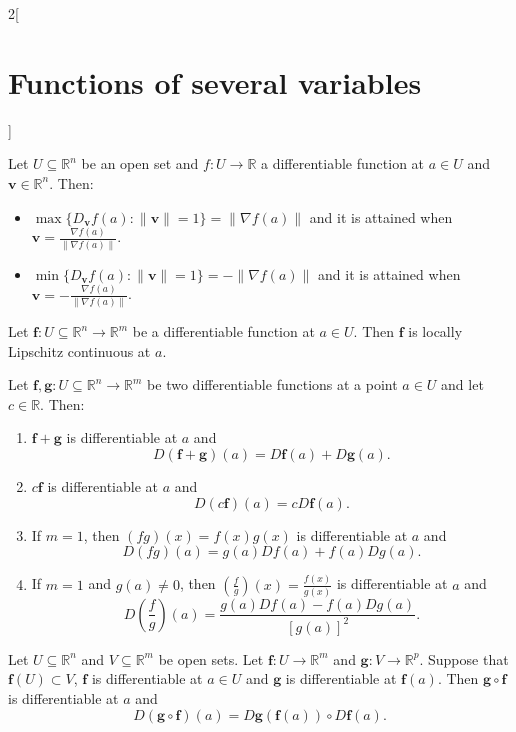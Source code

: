 \documentclass[../../../main.tex]{subfiles}
\begin{document}
\begin{multicols}{2}[\section{Functions of several variables}]
\begin{prop}
\end{prop}
\begin{prop}
Let $U\subseteq\mathbb{R}^n$ be an open set and $f:U\rightarrow\mathbb{R}$ a differentiable function at $a\in U$ and $\textbf{v}\in\mathbb{R}^n$. Then:
\begin{itemize}
    \item $\displaystyle\max\{D_\textbf{v}f(a):\|\textbf{v}\|=1\}=\|\nabla f(a)\|$ and it is attained when $\displaystyle \textbf{v}=\frac{\nabla f(a)}{\|\nabla f(a)\|}$.
    \item $\displaystyle\min\{D_\textbf{v}f(a):\|\textbf{v}\|=1\}=-\|\nabla f(a)\|$ and it is attained when $\displaystyle \textbf{v}=-\frac{\nabla f(a)}{\|\nabla f(a)\|}$.
\end{itemize}
\end{prop}
\begin{theorem}
Let $\boldsymbol{f}:U\subseteq\mathbb{R}^n\rightarrow\mathbb{R}^m$ be a differentiable function at $a\in U$. Then $\boldsymbol{f}$ is locally Lipschitz continuous at $a$.
\end{theorem}
\begin{theorem} 
Let $\boldsymbol{f},\boldsymbol{g}:U\subseteq\mathbb{R}^n\to\mathbb{R}^m$ be two differentiable functions at a point $a\in U$ and let $c\in\mathbb{R}$. Then:
\begin{enumerate}
    \item $\boldsymbol{f}+\boldsymbol{g}$ is differentiable at $a$ and $$D(\boldsymbol{f}+\boldsymbol{g})(a)=D\boldsymbol{f}(a)+D\boldsymbol{g}(a).$$
    \item $c\boldsymbol{f}$ is differentiable at $a$ and
    $$D(c\boldsymbol{f})(a)=cD\boldsymbol{f}(a).$$
    \item If $m=1$, then $(fg)(x)=f(x)g(x)$ is differentiable at $a$ and $$D(fg)(a)=g(a)Df(a)+f(a)Dg(a).$$
    \item If $m=1$ and $g(a)\ne0$, then $\displaystyle\left(\frac{f}{g}\right)(x)=\frac{f(x)}{g(x)}$ is differentiable at $a$ and $$D\left(\frac{f}{g}\right)(a)=\frac{g(a)Df(a)-f(a)Dg(a)}{[g(a)]^2}.$$
\end{enumerate}
\end{theorem}
\begin{theorem}
Let $U\subseteq\mathbb{R}^n$ and $V\subseteq\mathbb{R}^m$ be open sets. Let $\boldsymbol{f}:U\rightarrow\mathbb{R}^m$ and $\boldsymbol{g}:V\rightarrow\mathbb{R}^p$. Suppose that $\boldsymbol{f}(U)\subset V$, $\boldsymbol{f}$ is differentiable at $a\in U$ and $\boldsymbol{g}$ is differentiable at $\boldsymbol{f}(a)$. Then $\boldsymbol{g}\circ \boldsymbol{f}$ is differentiable at $a$ and $$D(\boldsymbol{g}\circ \boldsymbol{f})(a)=D\boldsymbol{g}(\boldsymbol{f}(a))\circ D\boldsymbol{f}(a).$$

\end{theorem}
\end{multicols}
\end{document}
